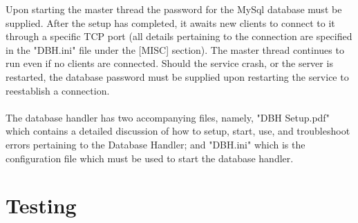 \documentclass[letterpaper]{report}
\begin{document}
	Upon starting the master thread the password for the MySql database must be supplied. After the setup has completed, it awaits new clients to connect to it through a specific TCP port (all details pertaining to the connection are specified in the "DBH.ini" file under the [MISC] section). The master thread continues to run even if no clients are connected. Should the service crash, or the server is restarted, the database password must be supplied upon restarting the service to reestablish a connection. \\ \\ The database handler has two accompanying files, namely, "DBH Setup.pdf" which contains a detailed discussion of how to setup, start, use, and troubleshoot errors pertaining to the Database Handler; and "DBH.ini" which is the configuration file which must be used to start the database handler.
	\chapter{Testing}
	
\end{document}
